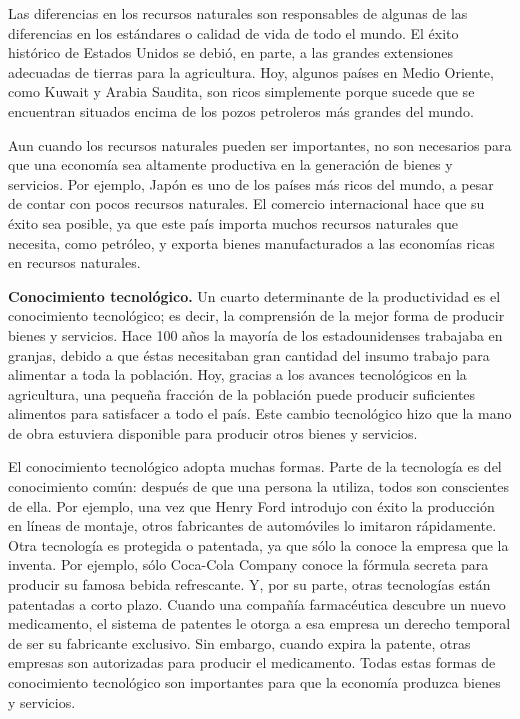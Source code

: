 \documentclass[
]{krantz}
\begin{document}
Las diferencias en los recursos naturales son responsables de algunas de las diferencias en los estándares o calidad de vida de todo el mundo. El éxito histórico de Estados Unidos se debió, en parte, a las grandes extensiones adecuadas de tierras para la agricultura. Hoy, algunos países en Medio Oriente, como Kuwait y Arabia Saudita, son ricos simplemente porque sucede que se encuentran situados encima de los pozos petroleros más grandes del mundo.

Aun cuando los recursos naturales pueden ser importantes, no son necesarios para que una economía sea altamente productiva en la generación de bienes y servicios. Por ejemplo, Japón es uno de los países más ricos del mundo, a pesar de contar con pocos recursos naturales. El comercio internacional hace que su éxito sea posible, ya que este país importa muchos recursos naturales que necesita, como petróleo, y exporta bienes manufacturados a las economías ricas en recursos naturales.

\textbf{Conocimiento tecnológico.} Un cuarto determinante de la productividad es el conocimiento tecnológico; es decir, la comprensión de la mejor forma de producir bienes y servicios. Hace 100 años la mayoría de los estadounidenses trabajaba en granjas, debido a que éstas necesitaban gran cantidad del insumo trabajo para alimentar a toda la población. Hoy, gracias a los avances tecnológicos en la agricultura, una pequeña fracción de la población puede producir suficientes alimentos para satisfacer a todo el país. Este cambio tecnológico hizo que la mano de obra estuviera disponible para producir otros bienes y servicios.

El conocimiento tecnológico adopta muchas formas. Parte de la tecnología es del conocimiento común: después de que una persona la utiliza, todos son conscientes de ella. Por ejemplo, una vez que Henry Ford introdujo con éxito la producción en líneas de montaje, otros fabricantes de automóviles lo imitaron rápidamente. Otra tecnología es protegida o patentada, ya que sólo la conoce la empresa que la inventa. Por ejemplo, sólo Coca-Cola Company conoce la fórmula secreta para producir su famosa bebida refrescante. Y, por su parte, otras tecnologías están patentadas a corto plazo. Cuando una compañía farmacéutica descubre un nuevo medicamento, el sistema de patentes le otorga a esa empresa un derecho temporal de ser su fabricante exclusivo. Sin embargo, cuando expira la patente, otras empresas son autorizadas para producir el medicamento. Todas estas formas de conocimiento tecnológico son importantes para que la economía produzca bienes y servicios.
\end{document}
